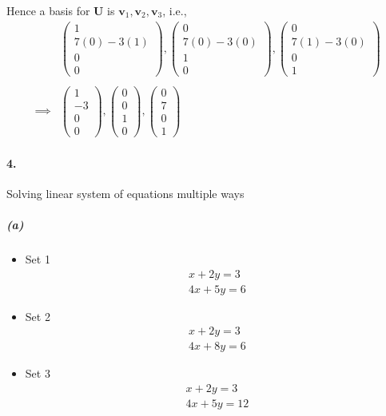 \documentclass[12pt, letterpaper]{article}
\begin{document}
Hence a basis for $\mathbf{U}$ is $\mathbf{v}_1,\mathbf{v}_2,\mathbf{v}_3$, i.e.,
\[
\begin{split}
&\begin{pmatrix} 1\\7(0) - 3(1)\\0\\0 \end{pmatrix},
\begin{pmatrix} 0\\7(0) - 3(0)\\1\\0 \end{pmatrix},
\begin{pmatrix} 0\\7(1) - 3(0)\\0\\1 \end{pmatrix}\\\\
\implies &\boxed{
\begin{pmatrix} 1\\-3\\0\\0 \end{pmatrix},
\begin{pmatrix} 0\\0\\1\\0 \end{pmatrix},
\begin{pmatrix} 0\\7\\0\\1 \end{pmatrix}
}
\end{split}
\]


\pagebreak
\paragraph{4.} Solving linear system of equations multiple ways

\subparagraph{(a)}
\begin{itemize}
\item Set 1 
  \[\begin{split} x + 2y = 3\\ 4x + 5y = 6 \end{split} \]
\item Set 2 
  \[\begin{split} x + 2y = 3\\ 4x + 8y = 6 \end{split} \]
\item Set 3 
  \[\begin{split} x + 2y = 3\\ 4x + 5y = 12 \end{split} \]
\end{itemize}
\end{document}
